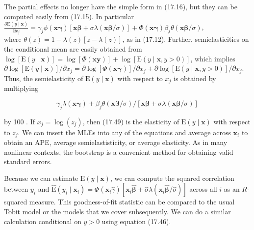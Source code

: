 \documentclass[10pt]{article}
\begin{document}
The partial effects no longer have the simple form in (17.16), but they can be computed easily from (17.15). In particular\\
$\frac{\partial \mathrm{E}(y \mid \mathbf{x})}{\partial x_{j}}=\gamma_{j} \phi(\mathbf{x} \boldsymbol{\gamma})[\mathbf{x} \boldsymbol{\beta}+\sigma \lambda(\mathbf{x} \boldsymbol{\beta} / \sigma)]+\Phi(\mathbf{x} \boldsymbol{\gamma}) \beta_{j} \theta(\mathbf{x} \boldsymbol{\beta} / \sigma)$,\\
where $\theta(z)=1-\lambda(z)[z-\lambda(z)]$, as in (17.12). Further, semielasticities on the conditional mean are easily obtained from $\log [\mathrm{E}(y \mid \mathbf{x})]=\log [\Phi(\mathbf{x} \boldsymbol{y})]+\log [\mathrm{E}(y \mid \mathbf{x}, y>0)]$, which implies $\partial \log [\mathrm{E}(y \mid \mathbf{x})] / \partial x_{j}=\partial \log [\Phi(\mathbf{x} \boldsymbol{\gamma})] / \partial x_{j}+\partial \log [\mathrm{E}(y \mid \mathbf{x}, y>0)] / \partial x_{j}$. Thus, the semielasticity of $\mathrm{E}(y \mid \mathbf{x})$ with respect to $x_{j}$ is obtained by multiplying


\begin{equation*}
\gamma_{j} \lambda(\mathbf{x} \boldsymbol{\gamma})+\beta_{j} \theta(\mathbf{x} \boldsymbol{\beta} / \sigma) /[\mathbf{x} \boldsymbol{\beta}+\sigma \lambda(\mathbf{x} \boldsymbol{\beta} / \sigma)] \tag{17.49}
\end{equation*}


by 100 . If $x_{j}=\log \left(z_{j}\right)$, then (17.49) is the elasticity of $\mathrm{E}(y \mid \mathbf{x})$ with respect to $z_{j}$. We can insert the MLEs into any of the equations and average across $\mathbf{x}_{i}$ to obtain an APE, average semielastisticity, or average elasticity. As in many nonlinear contexts, the bootstrap is a convenient method for obtaining valid standard errors.

Because we can estimate $\mathrm{E}(y \mid \mathbf{x})$, we can compute the squared correlation between $y_{i}$ and $\hat{\mathrm{E}}\left(y_{i} \mid \mathbf{x}_{i}\right)=\Phi\left(\mathbf{x}_{i} \hat{\gamma}\right)\left[\mathbf{x}_{i} \hat{\boldsymbol{\beta}}+\hat{\sigma} \lambda\left(\mathbf{x}_{i} \hat{\boldsymbol{\beta}} / \hat{\sigma}\right)\right]$ across all $i$ as an $R$-squared measure. This goodness-of-fit statistic can be compared to the usual Tobit model or the models that we cover subsequently. We can do a similar calculation conditional on $y>0$ using equation (17.46).
\end{document}
